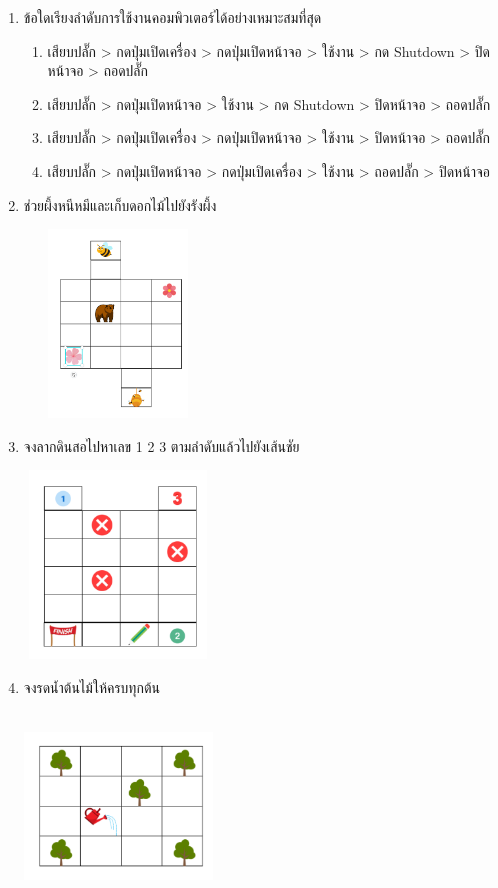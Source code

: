 \begin{enumerate}
\begin{enumerate}
    \end{enumerate}
    \item ข้อใดเรียงลำดับการใช้งานคอมพิวเตอร์ได้อย่างเหมาะสมที่สุด
    \begin{enumerate}
        \item เสียบปลั๊ก > กดปุ่มเปิดเครื่อง > กดปุ่มเปิดหน้าจอ > ใช้งาน > กด Shutdown > ปิดหน้าจอ > ถอดปลั๊ก
        \item เสียบปลั๊ก > กดปุ่มเปิดหน้าจอ > ใช้งาน > กด Shutdown > ปิดหน้าจอ > ถอดปลั๊ก
        \item เสียบปลั๊ก > กดปุ่มเปิดเครื่อง > กดปุ่มเปิดหน้าจอ > ใช้งาน > ปิดหน้าจอ > ถอดปลั๊ก
        \item เสียบปลั๊ก > กดปุ่มเปิดหน้าจอ > กดปุ่มเปิดเครื่อง > ใช้งาน > ถอดปลั๊ก > ปิดหน้าจอ
    \end{enumerate}
    \item ช่วยผึ้งหนีหมีและเก็บดอกไม้ไปยังรังผึ้ง
    \begin{center}
        \includegraphics[width=5cm, height=5cm]{pic-toro/exam/bee.png}
    \end{center}
    \item จงลากดินสอไปหาเลข 1 2 3 ตามลำดับแล้วไปยังเส้นชัย
    \begin{center}
        \includegraphics[width=5cm, height=5cm]{pic-toro/exam/pen.png}
    \end{center}
    \item จงรดน้ำต้นไม้ให้ครบทุกต้น
    \begin{center}
        \includegraphics[width=5cm, height=5cm]{pic-toro/exam/treeeasy.png}

\end{center}
\end{enumerate}

